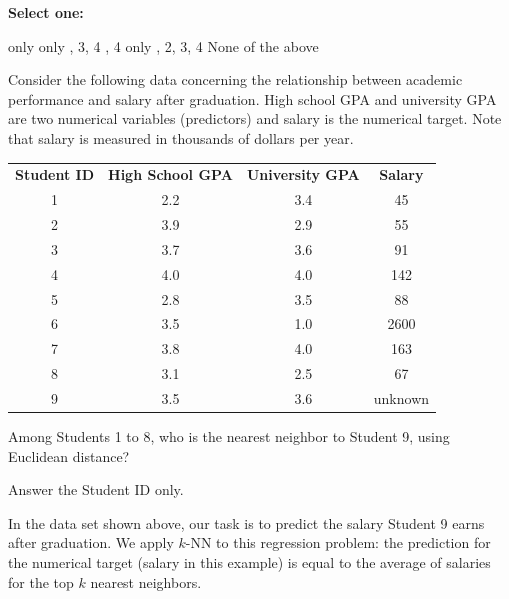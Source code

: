 \documentclass[11pt,addpoints,answers]{exam}
\numberwithin{equation}{section} %
\numberwithin{figure}{section} %
\numberwithin{table}{section} %
\begin{document}
\begin{questions}
    \textbf{Select one:}
    \begin{checkboxes}
         only
         only
        , 3, 4
        , 4
         only
        , 2, 3, 4
        \choice None of the above
    \end{checkboxes}
    
 
    
    \newpage
    \question[2] Consider the following data concerning the relationship between academic performance and salary after graduation. High school GPA and university GPA are two numerical variables (predictors) and salary is the numerical target. Note that salary is measured in thousands of dollars per year.
    
    \begin{table}[H]
        \centering
        \begin{tabular}{cccc}
            \textbf{Student ID} & \textbf{High School GPA} & \textbf{University GPA} & \textbf{Salary} \\
            1 & 2.2 & 3.4 & 45 \\
            2 & 3.9 & 2.9 & 55 \\
            3 & 3.7 & 3.6 & 91 \\
            4 & 4.0 & 4.0 & 142 \\
            5 & 2.8 & 3.5 & 88 \\
            6 & 3.5 & 1.0 & 2600 \\
            7 & 3.8 & 4.0 & 163 \\
            8 & 3.1 & 2.5 & 67 \\
            9 & 3.5 & 3.6 & unknown \\
        \end{tabular}
        \label{tab:my_label}
    \end{table}
    
    Among Students 1 to 8, who is the nearest neighbor to Student 9, using Euclidean distance?
    
    Answer the Student ID only.

    \begin{tcolorbox}[fit,height=1cm, width=4cm, blank, borderline={1pt}{-2pt},nobeforeafter, top=2pt, left=2pt, right=2pt, bottom=2pt]
    \end{tcolorbox}

 
    
    
    \question[3] In the data set shown above, our task is to predict the salary Student 9 earns after graduation. We apply $k$-NN to this regression problem: the prediction for the numerical target (salary in this example) is equal to the average of salaries for the top $k$ nearest neighbors. 
    

\end{questions}
\end{document}
